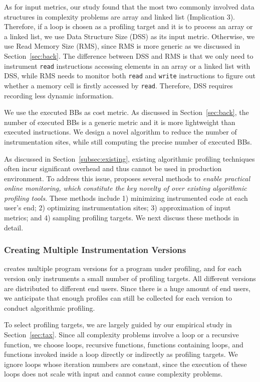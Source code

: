 As for input metrics, our study found that the most two commonly involved 
data structures in complexity problems 
are array and linked list (Implication 3). 
Therefore, if a loop is chosen as a profiling target 
and it is to process an array 
or a linked list, we use Data Structure Size (DSS) as its input metric. 
Otherwise, we use Read Memory Size (RMS), 
since RMS is more generic as we discussed in Section~\ref{sec:back}. 
The difference between DSS and RMS is that 
we only need to instrument \texttt{read} instructions accessing elements 
in an array or a linked list with DSS,
while RMS needs to monitor both \texttt{read} and \texttt{write}
instructions to figure out whether a memory cell is 
firstly accessed by \texttt{read}.
Therefore, DSS requires recording less dynamic information. 


We use the executed BBs as cost metric. 
As discussed in Section~\ref{sec:back}, 
the number of executed BBs is a generic metric 
and it is more lightweight than executed instructions. 
We design a novel algorithm to reduce the number of instrumentation sites,
while still computing the precise number of executed BBs. 



As discussed in Section~\ref{subsec:existing}, 
existing algorithmic profiling techniques
often incur significant overhead and thus cannot be used in production
environment. To address this issue, \Tool proposes several 
methods to \emph{enable practical online monitoring, which 
constitute the key novelty of \Tool over existing algorithmic profiling tools}.
These methods include 1) 
minimizing instrumented code at each user's end; 
2) optimizing instrumentation sites;
3) approximation of input metrics;
and 4) sampling profiling targets. 
We next discuss these methods in detail.


\subsubsection{Creating Multiple Instrumentation Versions}

\Tool creates multiple program versions for a program under profiling, 
and for each version \Tool only instruments a small number of 
profiling targets. 
All different versions are distributed to different end users. 
Since there is a huge amount of end users, 
we anticipate that enough profiles can still be collected 
for each version to conduct algorithmic profiling. 


To select profiling targets, 
we are largely guided by our empirical 
study in Section~\ref{sec:tax}.
Since all complexity problems involve a 
loop or a recursive function, 
we choose loops, recursive functions, functions containing loops,
and functions invoked inside a loop directly 
or indirectly as profiling targets. 
We ignore loops whose iteration numbers are constant,
since the execution of these loops does not scale with input 
and cannot cause complexity problems.

